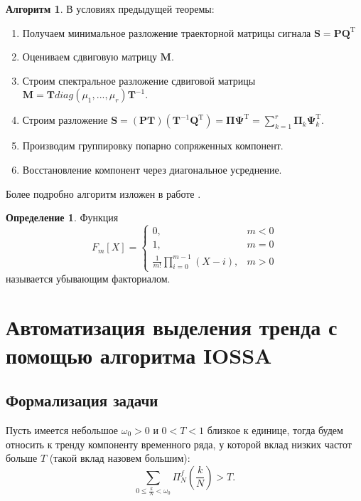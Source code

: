 \documentclass[specialist,
               substylefile = spbu_report.rtx,
               subf,href,colorlinks=true, 12pt]{disser}
\theoremstyle{definition}
\newtheorem{definition}{Определение}
\newtheorem{algorithm}{Алгоритм}
\begin{document}
\begin{algorithm} В условиях предыдущей теоремы:
\label{alg4}
    \begin{enumerate}
            \item Получаем минимальное разложение траекторной матрицы сигнала $\mathbf{S} = \mathbf{PQ}^{\mathrm{T}}$
            \item Оцениваем сдвиговую матрицу $\mathbf{M}$.
            \item Строим спектральное разложение сдвиговой матрицы $\mathbf{M} = \mathbf{T}diag(\mu_1, ..., \mu_r)\mathbf{T}^{-1}$.
            \item Строим разложение $\mathbf{S} = (\mathbf{PT})(\mathbf{T}^{-1}\mathbf{Q}^{\mathrm{T}}) = \mathbf{\Pi \Psi}^{\mathrm{T}} = \sum_{k = 1}^{r}\mathbf{\Pi}_k\mathbf{\Psi}^{\mathrm{T}}_k$.
            \item Производим группировку попарно сопряженных компонент.
            \item Восстановление компонент через диагональное усреднение. 
        \end{enumerate}
\end{algorithm}
Более подробно алгоритм изложен в работе \cite{Shlemov}.
    \label{algorithm:4}
    \begin{definition}
        Функция
        \begin{equation*}
            F_m[X] = \begin{cases}
            0, & m < 0 \\
            1, & m = 0 \\
            \frac{1}{m!}\prod_{i=0}^{m - 1}(X - i), & m>0
            \end{cases}
        \end{equation*}
        называется убывающим факториалом.
    \end{definition}
    
    
    
    
\chapter{Автоматизация выделения тренда с помощью алгоритма IOSSA}
\section{Формализация задачи}
Пусть имеется небольшое $\omega_0 > 0$ и $0 < T < 1$ близкое к единице, тогда будем относить к тренду компоненту временного ряда, у которой вклад низких частот больше $T$ (такой вклад назовем большим):
\begin{equation*}
    \sum\limits_{0 \leq \frac{k}{N} < \omega_0}\Pi_N^f(\frac{k}{N}) > T.
\end{equation*}
\end{document}

